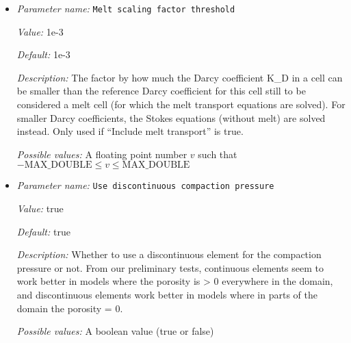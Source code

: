 \begin{itemize}
{\it Value:} false


{\it Default:} false


{\it Description:} Whether to include the transport of melt into the model or not. If this is set to true, two additional pressures (the fluid pressure and the compaction pressure) will be added to the finite element. Including melt transport in the simulation also requires that there is one compositional field that has the name `porosity'. This field will be used for computing the additional pressures and the melt velocity, and has a different advection equation than other compositional fields, as it is effectively advected with the melt velocity.


{\it Possible values:} A boolean value (true or false)
\item {\it Parameter name:} {\tt Melt scaling factor threshold}
\label{parameters:Melt settings/Melt scaling factor threshold}


{\it Value:} 1e-3


{\it Default:} 1e-3


{\it Description:} The factor by how much the Darcy coefficient K\_D in a cell can be smaller than the reference Darcy coefficient for this cell still to be considered a melt cell (for which the melt transport equations are solved). For smaller Darcy coefficients, the Stokes equations (without melt) are solved instead. Only used if ``Include melt transport'' is true. 


{\it Possible values:} A floating point number $v$ such that $-\text{MAX\_DOUBLE} \leq v \leq \text{MAX\_DOUBLE}$
\item {\it Parameter name:} {\tt Use discontinuous compaction pressure}
\label{parameters:Melt settings/Use discontinuous compaction pressure}


{\it Value:} true


{\it Default:} true


{\it Description:} Whether to use a discontinuous element for the compaction pressure or not. From our preliminary tests, continuous elements seem to work better in models where the porosity is > 0 everywhere in the domain, and discontinuous elements work better in models where in parts of the domain the porosity = 0.


{\it Possible values:} A boolean value (true or false)
\end{itemize}

